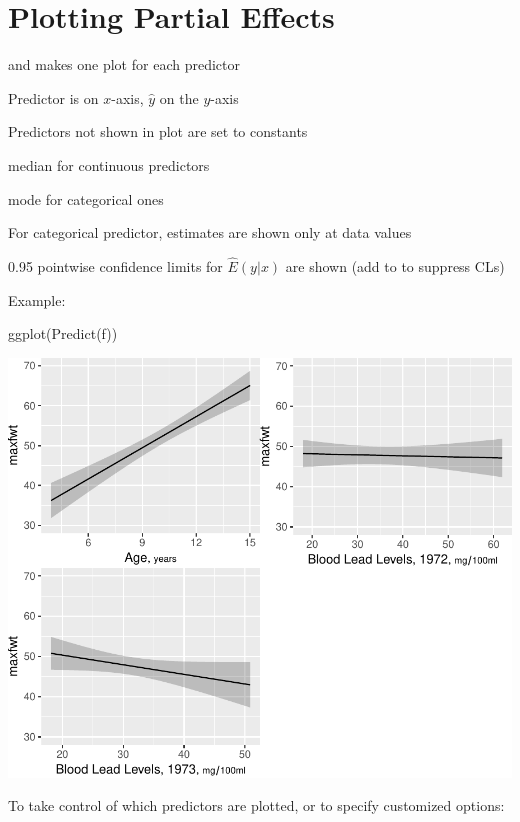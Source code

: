 \section{Plotting Partial Effects}
\bi
\item {} and  makes one plot for each predictor
\item Predictor is on $x$-axis, $\hat{y}$ on the $y$-axis
\item Predictors not shown in plot are set to constants
 \bi
 \item median for continuous predictors
 \item mode for categorical ones
 \ei
\item For categorical predictor, estimates are shown only at data
  values
\item 0.95 pointwise confidence limits for $\hat{E}(y|x)$ are shown
  (add  to  to suppress CLs)
\item Example: \ipacue
\begin{Schunk}
\begin{Sinput}
ggplot(Predict(f))
\end{Sinput}


\centerline{\includegraphics{rmsintro-unnamed-chunk-8-1} }

\end{Schunk}
\item To take control of which predictors are plotted, or to specify
  customized options: \ipacue
